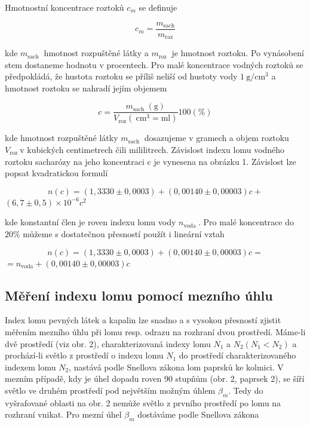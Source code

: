 \documentclass[czech,11pt,a4paper]{article}
\begin{document}
\begin{multicols}{2}
	
	
	Hmotnostní koncentrace roztoků $c_{m}$ se definuje
	
	
	\begin{equation}
		c_{m}=\frac{m_{\mathrm{sach}}}{m_{\mathrm{raz}}}
	\end{equation}
	
	
	kde $m_{\text {sach }}$ hmotnost rozpuštěné látky a $m_{\text {roz }}$ je hmotnost roztoku. Po vynásobení stem dostaneme hodnotu v procentech. Pro malé koncentrace vodných roztoků se předpokládá, že hustota roztoku se příliš neliší od hustoty vody $1 \mathrm{~g} / \mathrm{cm}^{3}$ a hmotnost roztoku se nahradí jejím objemem
	
	\begin{equation}
		c=\frac{m_{\text {sach }}(\mathrm{g})}{V_{\mathrm{roz}}\left(\mathrm{~cm}^{3}=\mathrm{ml}\right)} 100(\%)
	\end{equation}
	
	
	kde hmotnost rozpuštěné látky $m_{\text {sach }}$ dosazujeme v gramech a objem roztoku $V_{\text {roz }} \mathrm{v}$ kubických centimetrech čili mililitrech. Závislost indexu lomu vodného roztoku sacharózy na jeho koncentraci c je vynesena na obrázku 1. Závislost lze popsat kvadratickou formulí
	
	
{\small 	\begin{equation}
		n(c)=(1,3330 \pm 0,0003)+(0,00140 \pm 0,00003) c+
	\end{equation}
	$(6,7 \pm 0,5) \times 10^{-6} c^{2}$}
	
	kde konstantní člen je roven indexu lomu vody $n_{\text {voda }}$. Pro malé koncentrace do $20 \%$ můžeme s dostatečnou přesností použít i lineární vztah
	
	
	{\small \begin{equation}
		n(c)=(1,3330 \pm 0,0003)+(0,00140 \pm 0,00003) c=
	\end{equation}
	$		=n_{\mathrm{voda}}+(0,00140 \pm 0,00003) c$}
	
	\subsection*{Měření indexu lomu pomocí mezního úhlu}
	Index lomu pevných látek a kapalin lze snadno a s vysokou přesností zjistit měřením mezního úhlu při lomu resp. odrazu na rozhraní dvou prostředí. Máme-li dvě prostředí (viz obr. 2), charakterizovaná indexy lomu $N_{1}$ a $N_{2}\left(N_{1}<N_{2}\right)$ a prochází-li světlo z prostředí o indexu lomu $N_{1}$ do prostředí charakterizovaného indexem lomu $N_{2}$, nastává podle Snellova zákona lom paprsků ke kolmici. V mezním případě, kdy je úhel dopadu roven 90 stupňům (obr. 2, paprsek 2), se šíří světlo ve druhém prostředí pod největším možným úhlem $\beta_{m}$. Tedy do vyšrafované oblasti na obr. 2 nemůže světlo z prvního prostředí po lomu na rozhraní vnikat. Pro mezní úhel $\beta_{m}$ dostáváme podle Snellova zákona
	

\end{multicols}
\end{document}
